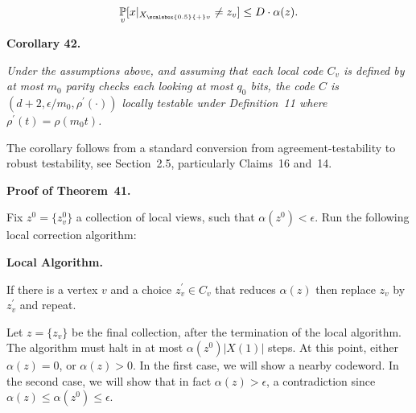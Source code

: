 \documentclass[10pt,a4paper]{article}
\begin{document}
\[\begin{gathered}
\operatorname*{\mathbb{P}}_{v}[x|_{{X}_{\scalebox{0.5}{+}v}}\neq z_{v}]\leq D\cdot\alpha(z).
\end{gathered}\]







\par\medskip\noindent\textbf{
\textbf{Corollary 42}\textbf{.}
}\par



\emph{Under the assumptions above, and assuming that each local code $C_{v}$ is defined by at most $m_{0}$ parity checks each looking at most $q_{0}$ bits, the code $C$ is $(d+2,\epsilon/m_{0},\rho^{\prime}(\cdot))$ locally testable under Definition 11 where $\rho^{\prime}(t)=\rho(m_{0}t)$.}\par






The corollary follows from a standard conversion from agreement-testability to robust testability, see Section 2.5, particularly Claims 16 and 14.\par




\par\medskip\noindent\textbf{Proof of Theorem 41.}\par




Fix $z^{0}=\{z^{0}_{v}\}$ a collection of local views, such that $\alpha(z^{0})<\epsilon$. Run the following local correction algorithm:\par





\par\medskip\noindent\textbf{Local Algorithm.}\par




If there is a vertex $v$ and a choice $z^{\prime}_{v}\in C_{v}$ that reduces $\alpha(z)$ then replace $z_{v}$ by $z^{\prime}_{v}$ and repeat.\par




Let $z=\{z_{v}\}$ be the final collection, after the termination of the local algorithm.
The algorithm must halt in at most $\alpha(z^{0})|X(1)|$ steps. At this point, either $\alpha(z)=0$, or $\alpha(z)>0$. In the first case, we will show a nearby codeword. In the second case, we will show that in fact $\alpha(z)>\epsilon$, a contradiction since $\alpha(z)\leq\alpha(z^{0})\leq\epsilon$.\par
\end{document}
